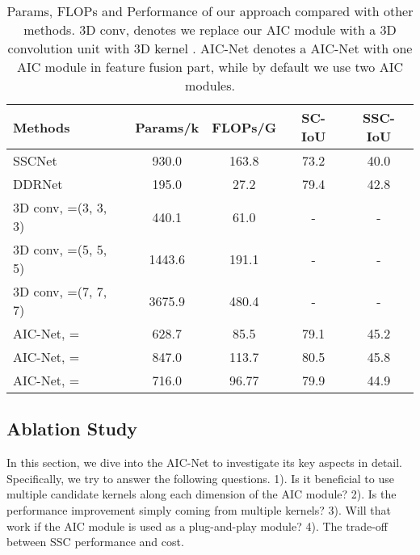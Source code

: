  \begin{table}[t]
\begin{center}
\scalebox{0.8}
{
\begin{tabular} {l|c|c|c|c} 
\hline
Methods 								& Params/k 	& FLOPs/G 	& SC-IoU	& SSC-IoU \\ \hline
SSCNet~\cite{song2017_SSCNet} 			& 930.0  	& 163.8     & 73.2		& 40.0 \\   
DDRNet~\cite{li2019rgbd} 			& 195.0  	& 27.2 	& 79.4	& 42.8 \\ 
\hline









3D conv, =(3, 3, 3) & 440.1 & 61.0 & - & - \\ 

3D conv, =(5, 5, 5) & 1443.6 & 191.1 & - & - \\ 

3D conv, =(7, 7, 7) & 3675.9 & 480.4 & - & - \\ 

\hline

AIC-Net, =  & 628.7 & 85.5 & 79.1 & 45.2 \\ 

AIC-Net, =  & 847.0 & 113.7 & 80.5 & 45.8\\ 

AIC-Net, =  & 716.0 & 96.77 & 79.9 & 44.9 \\


\hline
\end{tabular}
}
\caption{Params, FLOPs and Performance of our approach compared with other methods. 3D conv,  denotes we replace our AIC module with a 3D convolution unit with 3D kernel . AIC-Net denotes a AIC-Net with one AIC module in feature fusion part, while by default we use two AIC modules.}
\vspace{-0.6cm}
\label{tab:params}
\end{center}
\end{table}
 \subsection{Ablation Study}
\vspace{-0.1cm}
In this section, we dive into the AIC-Net to investigate its key aspects in detail. Specifically, we try to answer the following questions. 1). Is it beneficial to use multiple candidate kernels along each dimension of the AIC module? 2). Is the performance improvement simply coming from multiple kernels? 3). Will that work if the AIC module is used as a plug-and-play module? 4). The trade-off between SSC performance and cost.  







